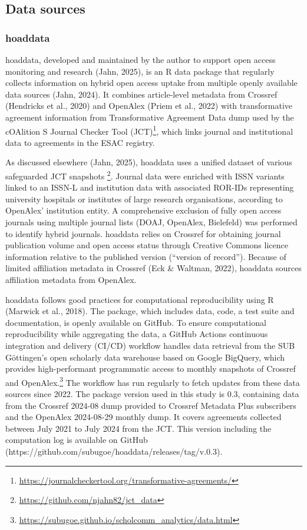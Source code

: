 \documentclass[a4paper,man,floatsintext,longtable,noextraspace,10pt]{apa6}
\begin{document}
\subsection{Data sources}\label{data-sources}

\subsubsection{hoaddata}\label{hoaddata}

hoaddata, developed and maintained by the author to support open access
monitoring and research (Jahn, 2025), is an R data package that
regularly collects information on hybrid open access uptake from
multiple openly available data sources (Jahn, 2024). It combines
article-level metadata from Crossref (Hendricks et al., 2020) and
OpenAlex (Priem et al., 2022) with transformative agreement information
from Transformative Agreement Data dump used by the cOAlition S Journal
Checker Tool (JCT)\footnote{\url{https://journalcheckertool.org/transformative-agreements/}},
which links journal and institutional data to agreements in the ESAC
registry.

As discussed elsewhere (Jahn, 2025), hoaddata uses a unified dataset of
various safeguarded JCT snapshots \footnote{\url{https://github.com/njahn82/jct_data}}.
Journal data were enriched with ISSN variants linked to an ISSN-L and
institution data with associated ROR-IDs representing university
hospitals or institutes of large research organisations, according to
OpenAlex' institution entity. A comprehensive exclusion of fully open
access journals using multiple journal lists (DOAJ, OpenAlex, Bielefeld)
was performed to identify hybrid journals. hoaddata relies on Crossref
for obtaining journal publication volume and open access status through
Creative Commons licence information relative to the published version
(``version of record''). Because of limited affiliation metadata in
Crossref (Eck \& Waltman, 2022), hoaddata sources affiliation metadata
from OpenAlex.

hoaddata follows good practices for computational reproducibility using
R (Marwick et al., 2018). The package, which includes data, code, a test
suite and documentation, is openly available on GitHub. To ensure
computational reproducibility while aggregating the data, a GitHub
Actions continuous integration and delivery (CI/CD) workflow handles
data retrieval from the SUB Göttingen's open scholarly data warehouse
based on Google BigQuery, which provides high-performant programmatic
access to monthly snapshots of Crossref and OpenAlex.\footnote{\url{https://subugoe.github.io/scholcomm_analytics/data.html}}
The workflow has run regularly to fetch updates from these data sources
since 2022. The package version used in this study is 0.3, containing
data from the Crossref 2024-08 dump provided to Crossref Metadata Plus
subscribers and the OpenAlex 2024-08-29 monthly dump. It covers
agreements collected between July 2021 to July 2024 from the JCT. This
version including the computation log is available on GitHub
(https://github.com/subugoe/hoaddata/releases/tag/v.0.3).
\end{document}

